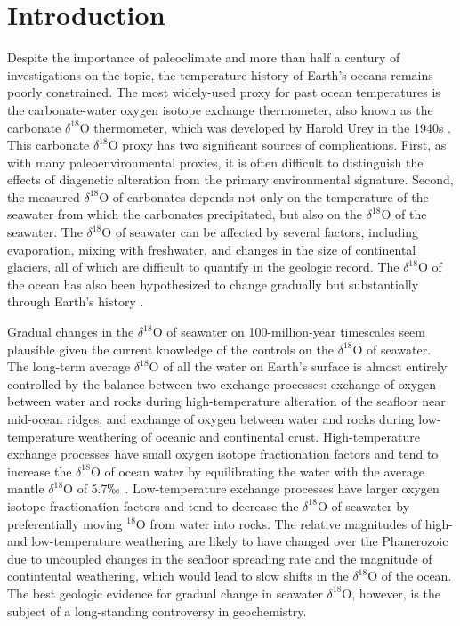 \documentclass[5p, authoryear]{elsarticle}
\newcommand{\deltao}{$\delta^{18}$}
\begin{document}
\section{Introduction}

Despite the importance of paleoclimate and more than half a century of investigations on the topic, the temperature history of Earth's oceans remains poorly constrained. The most widely-used proxy for past ocean temperatures is the carbonate-water oxygen isotope exchange thermometer, also known as the carbonate \deltao O thermometer, which was developed by Harold Urey in the 1940s \citep{Urey1947}. This carbonate \deltao O proxy has two significant sources of complications. First, as with many paleoenvironmental proxies, it is often difficult to distinguish the effects of diagenetic alteration from the primary environmental signature. Second, the measured \deltao O of carbonates depends not only on the temperature of the seawater from which the carbonates precipitated, but also on the \deltao O of the seawater. The \deltao O of seawater can be affected by several factors, including evaporation, mixing with freshwater, and changes in the size of continental glaciers, all of which are difficult to quantify in the geologic record. The 
\deltao O of the ocean has also been hypothesized to change gradually but substantially through Earth's history \citep{Jaffres2007,Veizer1999}. 

Gradual changes in the \deltao O of seawater on 100-million-year timescales seem plausible given the current knowledge of the controls on the \deltao O of seawater. The long-term average \deltao O of all the water on Earth's surface is almost entirely controlled by the balance between two exchange processes: exchange of oxygen between water and rocks during high-temperature alteration of the seafloor near mid-ocean ridges, and exchange of oxygen between water and rocks during low-temperature weathering of oceanic and continental crust. High-temperature exchange processes have small oxygen isotope fractionation factors and tend to increase the \deltao O of ocean water by equilibrating the water with the average mantle \deltao O of 5.7$\permil$ \citep{Gregory1991}. Low-temperature exchange processes have larger oxygen isotope fractionation factors and tend to decrease the \deltao O of seawater by preferentially moving $^{18}$O from water into rocks. The relative magnitudes of high- and low-temperature weathering are likely to have changed over the Phanerozoic due to uncoupled changes in the seafloor spreading rate \citep{Fornari1995,Tajika1993,Wallmann2001} and the magnitude of contintental weathering, which would lead to slow shifts in the \deltao O of the ocean. The best geologic evidence for gradual change in seawater \deltao O, however, is the subject of a long-standing controversy in geochemistry. 
\end{document}
